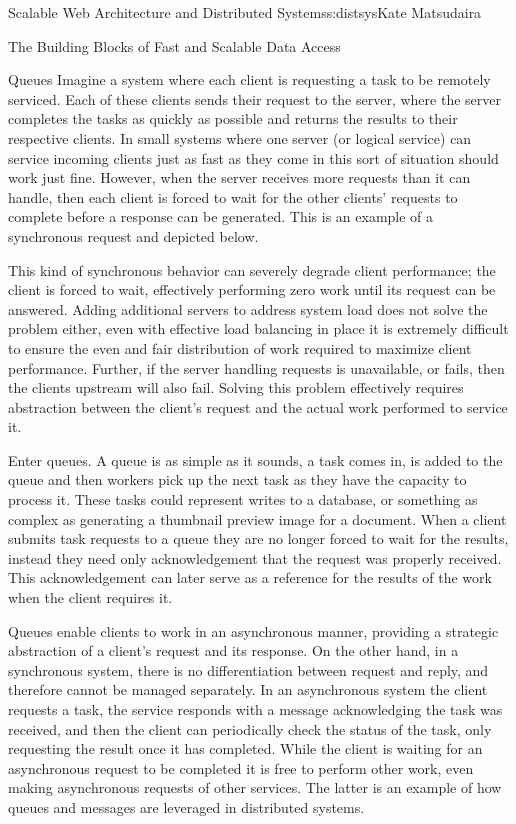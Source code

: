 \begin{aosachapter}{Scalable Web Architecture and Distributed Systems}{s:distsys}{Kate Matsudaira}
\begin{aosasect1}{The Building Blocks of Fast and Scalable Data Access}
\begin{aosasect2}{Queues}
Imagine a system where each client is requesting a task to be remotely
serviced. Each of these clients sends their request to the server,
where the server completes the tasks as quickly as possible and
returns the results to their respective clients. In small systems
where one server (or logical service) can service incoming clients
just as fast as they come in this sort of situation should work just
fine. However, when the server receives more requests than it can
handle, then each client is forced to wait for the other clients’
requests to complete before a response can be generated. This is an
example of a synchronous request and depicted below.


This kind of synchronous behavior can severely degrade client
performance; the client is forced to wait, effectively performing zero
work until its request can be answered. Adding additional servers to
address system load does not solve the problem either, even with
effective load balancing in place it is extremely difficult to ensure
the even and fair distribution of work required to maximize client
performance. Further, if the server handling requests is unavailable,
or fails, then the clients upstream will also fail. Solving this
problem effectively requires abstraction between the client’s request
and the actual work performed to service it.

Enter queues. A queue is as simple as it sounds, a task comes in, is
added to the queue and then workers pick up the next task as they have
the capacity to process it. These tasks could represent writes to a
database, or something as complex as generating a thumbnail preview
image for a document. When a client submits task requests to a queue
they are no longer forced to wait for the results, instead they need
only acknowledgement that the request was properly received. This
acknowledgement can later serve as a reference for the results of the
work when the client requires it.

Queues enable clients to work in an asynchronous manner, providing a
strategic abstraction of a client’s request and its response. On the
other hand, in a synchronous system, there is no differentiation
between request and reply, and therefore cannot be managed
separately. In an asynchronous system the client requests a task, the
service responds with a message acknowledging the task was received,
and then the client can periodically check the status of the task,
only requesting the result once it has completed. While the client is
waiting for an asynchronous request to be completed it is free to
perform other work, even making asynchronous requests of other
services. The latter is an example of how queues and messages are
leveraged in distributed systems.


\end{aosasect2}
\end{aosasect1}
\end{aosachapter}
